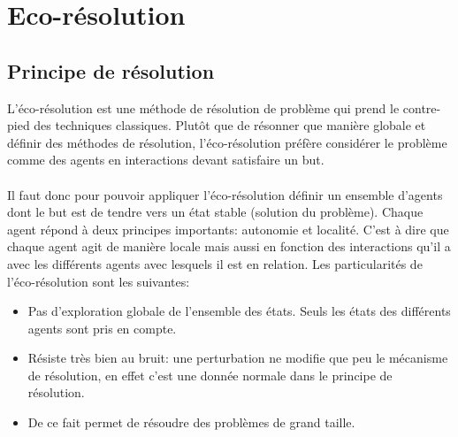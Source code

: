 	\section{Eco-résolution}
    \subsection{Principe de résolution}
        L'éco-résolution est une méthode de résolution de problème qui prend le contre-pied des techniques classiques. Plutôt que de résonner que manière globale et définir des méthodes de résolution, l'éco-résolution préfère considérer le problème comme des agents en interactions devant satisfaire un but. \\ \\
        Il faut donc pour pouvoir appliquer l'éco-résolution définir un ensemble d'agents dont le but est de tendre vers un état stable (solution du problème). Chaque agent répond à deux principes importants: autonomie et localité. C'est à dire que chaque agent agit de manière locale mais aussi en fonction des interactions qu'il a avec les différents agents avec lesquels il est en relation.
        Les particularités de l'éco-résolution sont les suivantes:
        \begin{itemize}
        \item Pas d'exploration globale de l'ensemble des états. Seuls les états des différents agents sont pris en compte. 
        \item Résiste très bien au bruit: une perturbation ne modifie que peu le mécanisme de résolution, en effet c'est une donnée normale dans le principe de résolution.
        \item De ce fait permet de résoudre des problèmes de grand taille. 
        \end{itemize}
    
